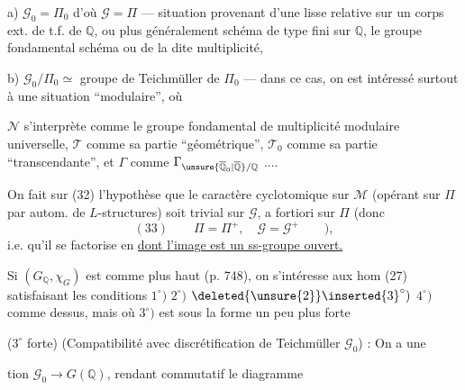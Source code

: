 a) $\mathcal{G}_0=\Pi_0$ d'où $\mathcal{G}=\Pi$ --- situation provenant d'une  lisse relative sur un corps  ext. de t.f. de $\mathbb{Q}$, ou plus généralement  schéma   de type fini sur $\mathbb{Q}$,   le groupe fondamental  schéma ou de la dite multiplicité,

b) $\mathcal{G}_0/\Pi_0\simeq$ groupe de Teichmüller de $\Pi_0$  --- dans ce cas, on est intéressé surtout à une situation ``modulaire'', où


$\mathcal{N}$ s'interprète comme le groupe fondamental de  multiplicité modulaire universelle, $\mathcal{T}$ comme sa partie ``géométrique'', $\mathcal{T}_0$ comme sa partie ``transcendante'', et $\Gamma$ comme $\Gamma_{\unsure{\overline{\mathbb{Q}}_0|\overline{\mathbb{Q}}}/\mathbb{Q}}$ ....

On fait sur (32) l'hypothèse que le caractère cyclotomique sur $\mathcal{M}$ (opérant sur $\Pi$ par autom. de $L$-structures) soit trivial sur $\mathcal{G}$, a fortiori sur $\Pi$ (donc
\[
(33)\qquad \Pi=\Pi^{+},\quad \mathcal{G}=\mathcal{G}^{+}\qquad ),
\]
i.e. qu'il se factorise en
\uline{dont l'image est un ss-groupe ouvert.}

Si $(G_{\mathbb{Q}},\chi_G)$ est comme plus haut (p. 748), on s'intéresse aux hom (27)
satisfaisant les conditions $1^{\circ})$ $2^{\circ})$ $\deleted{\unsure{2}}\inserted{3}^{\circ})$ $4^{\circ})$ comme dessus, mais où $3^{\circ})$ est  sous la forme un peu plus forte

($3^{\circ}$ forte) (Compatibilité avec discrétification de Teichmüller $\mathcal{G}_0$) : On a une 


tion $\mathcal{G}_0\longrightarrow G(\mathbb{Q})$, rendant  commutatif le diagramme

